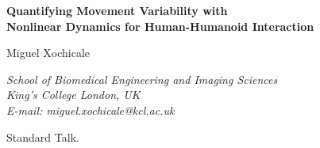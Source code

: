 \documentclass[12pt]{article}
\begin{document}
\begin{center}

{\bf\Large
Quantifying Movement Variability with \\ 
Nonlinear Dynamics for 
Human-Humanoid Interaction 
}

\vspace{8mm}


{\sc\large Miguel Xochicale}

\vspace{3mm}

{\em School of Biomedical Engineering and Imaging Sciences \\
King's College London, UK \\
E-mail: miguel.xochicale@kcl.ac.uk}

\vspace{5mm}




\end{center}
\vspace{8mm}
  Standard Talk.
%
\vspace{8mm}
\end{document}
